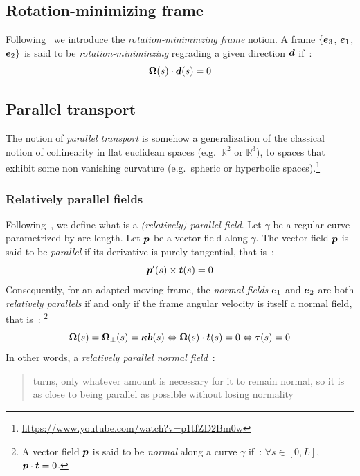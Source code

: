 \subsection{Rotation-minimizing frame}
Following~\cite{Farouki2014, Wang2008} we introduce the \emph{rotation-miniminzing frame} notion. A frame $\{\boldsymbol{e}_{3}$, $\boldsymbol{e}_{1}$, $\boldsymbol{e}_{2}\}$ is said to be \emph{rotation-miniminzing} regrading a given direction $\boldsymbol{d}$ if~:
\begin{equation}
	\boldsymbol{\Omega}(s) \cdot \boldsymbol{d}(s) = 0
\end{equation}

\subsection{Parallel transport}\label{sec:paralleltransport}
The notion of \emph{parallel transport} is somehow a generalization of the classical notion of collinearity in flat euclidean spaces (e.g.\ $\mathbb{R}^2$ or $\mathbb{R}^3$), to spaces that exhibit some non vanishing curvature (e.g.\ spheric or hyperbolic spaces).\footnote{\url{https://www.youtube.com/watch?v=p1tfZD2Bm0w}}

\subsubsection{Relatively parallel fields}
Following~, we define what is a \emph{(relatively) parallel field}. Let $\gamma$ be a regular curve parametrized by arc length. Let $\boldsymbol{p}$ be a vector field along $\gamma$. The vector field $\boldsymbol{p}$ is said to be \emph{parallel} if its derivative is purely tangential, that is~:
\begin{equation}
	\boldsymbol{p}'(s) \times \boldsymbol{t}(s) = 0
\end{equation}
Consequently, for an adapted moving frame, the \emph{normal fields} $\boldsymbol{e}_1$ and $\boldsymbol{e}_2$ are both \emph{relatively parallels} if and only if the frame angular velocity is itself a normal field, that is~: \footnote{A vector field $\boldsymbol{p}$ is said to be \emph{normal} along a curve $\gamma$ if~: $\forall s \in [0,L]$, $\boldsymbol{p}\cdot\boldsymbol{t} = 0$.}
\begin{equation}
	\boldsymbol{\Omega}(s) = \boldsymbol{\Omega}_{\perp}(s) =  \boldsymbol{\kappa b}(s) \Leftrightarrow \boldsymbol{\Omega}(s) \cdot \boldsymbol{t}(s) = 0  \Leftrightarrow \tau(s) = 0  
\end{equation}
In other words, a \emph{relatively parallel normal field}~: \blockcquote{Bishop1975}{turns, only whatever amount is necessary for it to remain normal, so it is as close to being parallel as possible without losing normality}. 
%


